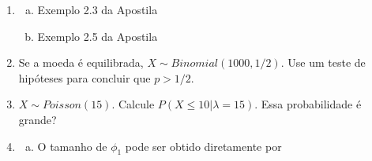 \documentclass[10pt,brazil]{exam}
\begin{document}
\begin{enumerate}[1.]

\item %

\begin{enumerate}[a)]
\item Exemplo 2.3 da Apostila%
\item Exemplo 2.5 da Apostila %
\end{enumerate}






\medskip
\item %
Se a moeda é equilibrada, $X\sim Binomial(1000,1/2)$.
 Use um teste de hipóteses para concluir que $p>1/2$.



\medskip
\item%
$X\sim Poisson(15)$.
Calcule $P(X\leq 10|\lambda=15)$. Essa probabilidade é grande? 





\medskip
\item%


\begin{enumerate}[a)]
\item 
O tamanho de $\phi_1$ pode ser obtido diretamente por 


\end{enumerate}
\end{enumerate}
\end{document}

